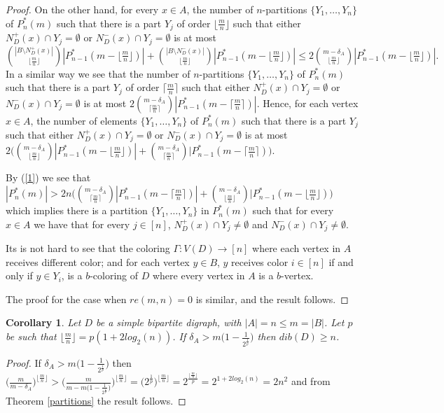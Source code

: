 \documentclass[12pt]{article}
\newtheorem{corollary}[theorem]{Corollary}
\begin{document}
\begin{proof}
On the other hand, for every $x\in A$,  the number of $n$-partitions  $\{Y_1, \dots, Y_n\}$  of $P^*_n(m)$ such that there is a part $Y_j$ of order $\lfloor\frac{m}{n}\rfloor$ such that either $N_D^+(x)\cap Y_j=\emptyset$ or $N_D^-(x)\cap Y_j=\emptyset$ is at most ${{|B\setminus N^+_D(x)|}\choose{\lfloor\frac{m}{n}\rfloor}}|P^*_{n-1}(m-\lfloor\frac{m}{n}\rfloor)| + {{|B\setminus N^-_D(x)|}\choose{\lfloor\frac{m}{n}\rfloor}}|P^*_{n-1}(m-\lfloor\frac{m}{n}\rfloor)|\leq 2{{m-\delta_A}\choose{\lfloor\frac{m}{n}\rfloor}}|P^*_{n-1}(m-\lfloor\frac{m}{n}\rfloor)|.$ In a similar way we see that the number of $n$-partitions  $\{Y_1, \dots, Y_n\}$  of $P^*_n(m)$ such that there is a part $Y_j$ of order $\lceil\frac{m}{n}\rceil$ such that either $N_D^+(x)\cap Y_j=\emptyset$ or $N_D^-(x)\cap Y_j=\emptyset$ is at most $2{{m-\delta_A}\choose{\lceil\frac{m}{n}\rceil}}|P^*_{n-1}(m-\lceil\frac{m}{n}\rceil)|$. Hence, for each vertex $x\in A$, the number of elements $\{Y_1, \dots, Y_n\}$  of $P^*_n(m)$ such that there is a part $Y_j$  such that either $N_D^+(x)\cap Y_j=\emptyset$ or $N_D^-(x)\cap Y_j=\emptyset$ is at most $2\Big({{m-\delta_A}\choose{\lfloor\frac{m}{n}\rfloor}}|P^*_{n-1}(m-\lfloor\frac{m}{n}\rfloor)|+ {{m-\delta_A}\choose{\lceil\frac{m}{n}\rceil}}|P^*_{n-1}(m-\lceil\frac{m}{n}\rceil)\Big)$. 

By (\ref{1}) we see that $|P^*_n(m)| > 2n\Big({{m-\delta_A}\choose{\lceil\frac{m}{n}\rceil}}|P^*_{n-1}(m-\lceil\frac{m}{n}\rceil)| + {{m-\delta_A}\choose{\lfloor\frac{m}{n}\rfloor}}|P^*_{n-1}(m-\lfloor\frac{m}{n}\rfloor)\Big)$ which implies there is a partition $\{Y_1, \dots, Y_n\}$  in $P^*_n(m)$ such that for every $x\in A$ we have that for every $j\in [n]$, $N_D^+(x)\cap Y_j\not=\emptyset$ and $N_D^-(x)\cap Y_j\not=\emptyset$. 

Its is not hard to see that the coloring $\Gamma: V(D)\rightarrow [n]$ where each vertex in $A$ receives different color; and for each vertex $y\in B$, $y$ receives color $i\in [n]$ if and only if $y\in Y_i$, is a $b$-coloring of $D$ where every vertex in $A$ is a $b$-vertex. 

The proof for the case when $re(m,n)=0$ is similar, and the result follows. \end{proof}


\begin{corollary}
     Let $D$ be a simple bipartite  digraph, with $|A| = n\leq m = |B|$. Let $p$ be such that $\lfloor\frac{m}{n}\rfloor=p(1+2log_2(n))$. If $\delta_A > m\Big(1-\frac{1}{2^\frac{1}{p}}\Big)$  then $dib(D)\geq n$.    
\end{corollary}
\begin{proof}  If $\delta_A > m\Big(1-\frac{1}{2^\frac{1}{p}}\Big)$ then $\Big( \frac{m}{m-\delta_A}\Big)^{\lfloor\frac{m}{n}\rfloor} > \Big( \frac{m}{m-m\Big(1-\frac{1}{2^\frac{1}{p}}\Big)}\Big)^{\lfloor\frac{m}{n}\rfloor} = \Big( 2^\frac{1}{p}\Big)^{\lfloor\frac{m}{n}\rfloor} = 2^\frac{\lfloor\frac{m}{n}\rfloor}{p}= 2^{1+2log_2(n)} = 2n^2$ and from Theorem \ref{partitions} the result follows.   
\end{proof}
\end{document}
